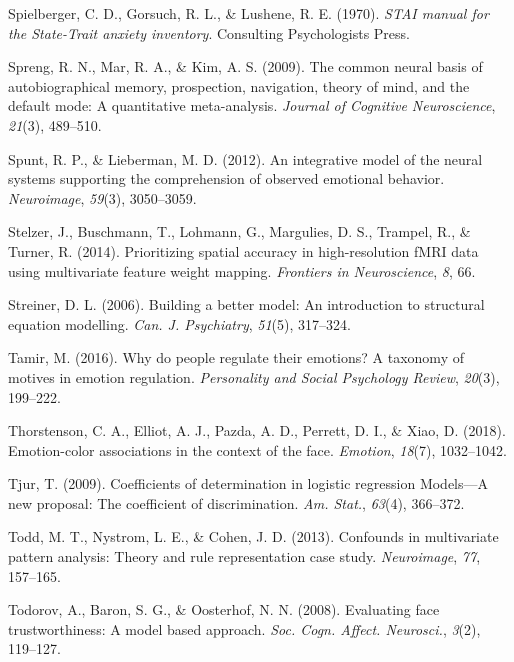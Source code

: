 \documentclass[11pt,american,]{memoir} %
\begin{document}
\leavevmode\hypertarget{ref-Spielberger1970-td}{}%
Spielberger, C. D., Gorsuch, R. L., \& Lushene, R. E. (1970). \emph{STAI manual for the State-Trait anxiety inventory}. Consulting Psychologists Press.

\leavevmode\hypertarget{ref-spreng2009common}{}%
Spreng, R. N., Mar, R. A., \& Kim, A. S. (2009). The common neural basis of autobiographical memory, prospection, navigation, theory of mind, and the default mode: A quantitative meta-analysis. \emph{Journal of Cognitive Neuroscience}, \emph{21}(3), 489--510.

\leavevmode\hypertarget{ref-spunt2012integrative}{}%
Spunt, R. P., \& Lieberman, M. D. (2012). An integrative model of the neural systems supporting the comprehension of observed emotional behavior. \emph{Neuroimage}, \emph{59}(3), 3050--3059.

\leavevmode\hypertarget{ref-stelzer2014prioritizing}{}%
Stelzer, J., Buschmann, T., Lohmann, G., Margulies, D. S., Trampel, R., \& Turner, R. (2014). Prioritizing spatial accuracy in high-resolution fMRI data using multivariate feature weight mapping. \emph{Frontiers in Neuroscience}, \emph{8}, 66.

\leavevmode\hypertarget{ref-Streiner2006-ze}{}%
Streiner, D. L. (2006). Building a better model: An introduction to structural equation modelling. \emph{Can. J. Psychiatry}, \emph{51}(5), 317--324.

\leavevmode\hypertarget{ref-tamir2016people}{}%
Tamir, M. (2016). Why do people regulate their emotions? A taxonomy of motives in emotion regulation. \emph{Personality and Social Psychology Review}, \emph{20}(3), 199--222.

\leavevmode\hypertarget{ref-Thorstenson2018-io}{}%
Thorstenson, C. A., Elliot, A. J., Pazda, A. D., Perrett, D. I., \& Xiao, D. (2018). Emotion-color associations in the context of the face. \emph{Emotion}, \emph{18}(7), 1032--1042.

\leavevmode\hypertarget{ref-Tjur2009-dp}{}%
Tjur, T. (2009). Coefficients of determination in logistic regression Models---A new proposal: The coefficient of discrimination. \emph{Am. Stat.}, \emph{63}(4), 366--372.

\leavevmode\hypertarget{ref-Todd2013-sd}{}%
Todd, M. T., Nystrom, L. E., \& Cohen, J. D. (2013). Confounds in multivariate pattern analysis: Theory and rule representation case study. \emph{Neuroimage}, \emph{77}, 157--165.

\leavevmode\hypertarget{ref-Todorov2008-eb}{}%
Todorov, A., Baron, S. G., \& Oosterhof, N. N. (2008). Evaluating face trustworthiness: A model based approach. \emph{Soc. Cogn. Affect. Neurosci.}, \emph{3}(2), 119--127.
\end{document}

